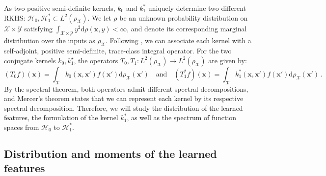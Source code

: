As two positive semi-definite kernels, $k_0$ and $k^*_1$ uniquely determine two different RKHS: $\mathcal H_0, \mathcal H_1^* \subset L^2(\rho_{\mathcal X})$. We let $\rho$ be an unknown probability distribution on $\mathcal{X} \times \mathcal{Y}$ satisfying $\int_{\mathcal{X} \times \mathcal{Y}} y^2 \mathrm{d}\rho(\bm{x}, y) < \infty$, and denote its corresponding marginal distribution over the inputs as $\rho_{\mathcal{X}}$. Following \cite{bach2017equivalence}, we can associate each kernel with a self-adjoint, positive semi-definite, trace-class integral operator. For the two conjugate kernels $k_{0},k_{1}^{\star}$, the operators $T_0,T_1 : L^2(\rho_{\mathcal{X}}) \to L^2(\rho_{\mathcal{X}})$ are given by:
\begin{equation}\label{eq:int-ops}
    (T_0 f)(\bm{x}) = \int_{\mathcal{X}} k_0(\bm{x}, \bm{x}') f(\bm{x}') \mathrm{d}\rho_{\mathcal{X}}(\bm{x}') \quad \text{and} \quad (T_1^* f)(\bm{x}) = \int_{\mathcal{X}} k_1^*(\bm{x}, \bm{x}') f(\bm{x}') \mathrm{d}\rho_{\mathcal{X}}(\bm{x}')\, .
\end{equation}
By the spectral theorem, both operators admit different spectral decompositions, and Mercer's theorem states that we can represent each kernel by its respective spectral decomposition. Therefore, we will study the distribution of the learned features, the formulation of the kernel $k_1^{*}$, as well as the spectrum of function spaces from $\mathcal H_{0}$ to $\mathcal H_{1}^{*}$.

\subsection{Distribution and moments of the learned features}

